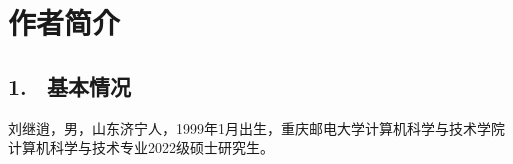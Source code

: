 







\specialsectioning


\chapter{作者简介}
\thispagestyle{others}
\pagestyle{others}
\xiaosi
\vspace{-0.1cm}
\section{1. \ 基本情况}
\vspace{-0.1cm}
刘继逍，男，山东济宁人，1999年1月出生，重庆邮电大学计算机科学与技术学院计算机科学与技术专业2022级硕士研究生。


